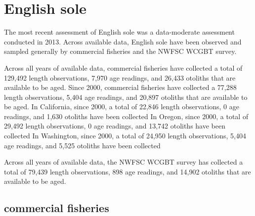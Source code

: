 \documentclass[11pt,
  english,
  letterpaper,
]{article}
\begin{document}
\leavevmode\tagmcend\tagstructend\par
\endgroup{}
\endgroup{}


\hypertarget{english-sole}{%
\section{English sole}\label{english-sole}}

\leavevmode\tagmcend\tagstructend


The most recent assessment of English sole was a data-moderate assessment conducted in 2013. Across available data, English sole have been observed and sampled generally by commercial fisheries and the NWFSC WCGBT survey.

\leavevmode\tagmcend\tagstructend\par


Across all years of available data, commercial fisheries have collected a total of 129,492 length observations, 7,970 age readings, and 26,433 otoliths that are available to be aged. Since 2000, commercial fisheries have collected a 77,288 length observations, 5,404 age readings, and 20,897 otoliths that are available to be aged. In California, since 2000, a total of 22,846 length observations, 0 age readings, and 1,630 otoliths have been collected In Oregon, since 2000, a total of 29,492 length observations, 0 age readings, and 13,742 otoliths have been collected In Washington, since 2000, a total of 24,950 length observations, 5,404 age readings, and 5,525 otoliths have been collected

\leavevmode\tagmcend\tagstructend\par


Across all years of available data, the NWFSC WCGBT survey has collected a total of 79,439 length observations, 898 age readings, and 14,902 otoliths that are available to be aged.

\leavevmode\tagmcend\tagstructend\par


\hypertarget{commercial-fisheries-19}{%
\subsection{commercial fisheries}\label{commercial-fisheries-19}}
\end{document}
